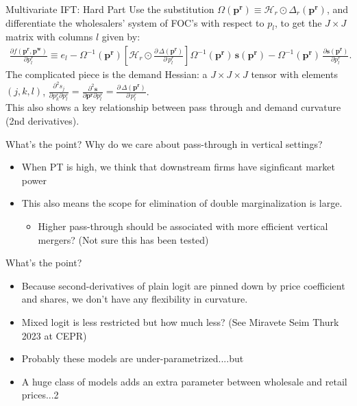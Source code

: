 \documentclass[aspectratio=169,10pt]{beamer}
\begin{document}
\begin{frame}{Multivariate IFT: Hard Part}
Use the substitution $\Omega(\symbf{p^r}) \equiv \mathcal{H}_r \odot \Delta_{r}(\symbf{p^r})$, and differentiate the wholesalers' system of FOC's with respect to $p_l$, to get the $J \times J$ matrix with columns $l$ given by:
\begin{align}
\frac{\partial f(\symbf{p^r},\symbf{p^w})}{\partial p_l^r} \equiv e_l - \Omega^{-1}(\symbf{p^r})
\left[  \mathcal{H}_{r} \odot \frac{\partial\, \Delta(\symbf{p^r})}{\partial\, p_l^r} \right]
\Omega^{-1}(\symbf{p^r})\,
\symbf{s}(\symbf{p^r}) -\Omega^{-1}(\symbf{p^r})\, \frac{\partial \symbf{s}(\symbf{p^r})}{\partial p_l^r}.
\end{align}
The complicated piece is the demand Hessian: a $J \times J \times J$ tensor with elements $(j,k,l)$, $\frac{\partial^2 s_j}{\partial p_k^r \partial p_l^r} = \frac{\partial^2 \symbf{s}}{\partial \symbf{p^r} \partial p_l^r}=\frac{\partial\, \Delta(\symbf{p^r})}{\partial\, p_l^r}$.\\

This also shows a key relationship between \alert{pass through} and \alert{demand curvature} (2nd derivatives).
\end{frame}



\begin{frame}{What's the point?}
Why do we care about pass-through in vertical settings?
\begin{itemize}
\item When PT is high, we think that downstream firms have siginficant market power
\item This also means the scope for \alert{elimination of double marginalization} is large.
\begin{itemize}
\item Higher pass-through should be associated with more efficient vertical mergers? (Not sure this has been tested)
\end{itemize}
\end{itemize}
\end{frame}




\begin{frame}{What's the point?}

\begin{itemize}
\item Because second-derivatives of plain logit are pinned down by price coefficient and shares, we don't have any flexibility in curvature.
\item Mixed logit is less restricted but how much less? (See Miravete Seim Thurk 2023 at CEPR)
\item Probably these models are under-parametrized....but
\item A huge class of models adds an extra parameter between wholesale and retail prices...2
\end{itemize}
\end{frame}
\end{document}
